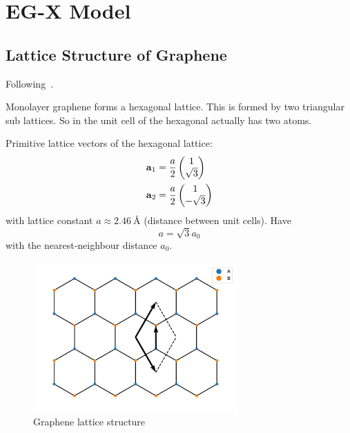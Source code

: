 \chapter{EG-X Model}\label{ch:eg-x-model}

\section{Lattice Structure of Graphene}\label{sec:lattice-structure-of-graphene}

Following~\cite{Yang_Li_Lee_Ng_2018}.

Monolayer graphene forms a hexagonal lattice.
This is formed by two triangular sub lattices.
So in the unit cell of the hexagonal actually has two atoms.

Primitive lattice vectors of the hexagonal lattice:
\begin{align}
    \bm{\mathrm{a}}_1 &= \frac{a}{2} \begin{pmatrix} 1 \\ \sqrt{3} \end{pmatrix} \\
    \bm{\mathrm{a}}_2 &= \frac{a}{2} \begin{pmatrix} 1 \\ -\sqrt{3} \end{pmatrix}
\end{align}
with lattice constant \(a \approx \SI{2.46}{\angstrom}\) (distance between unit cells).
Have
\begin{equation}
    a = \sqrt{3} a_0
\end{equation}
with the nearest-neighbour distance \(a_0\).

\begin{figure}[htb]
    \centering
    \includegraphics[width=0.7\textwidth]{images/graphene lattice}
    \caption{Graphene lattice structure}
    \label{fig:graphene lattice structure}
\end{figure}

